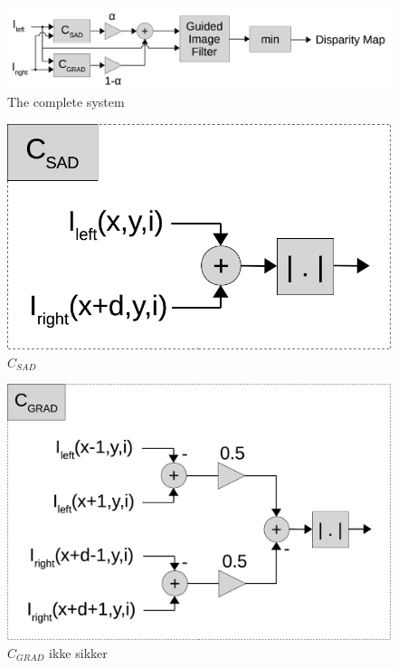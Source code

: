 \begin{figure}[ht!]
  \centering
  \includegraphics[scale=0.3]{figures/whole_system}
  \caption{The complete system}
  \label{fig:whole_system}
\end{figure}

\begin{figure}[ht!]
  \centering
  \includegraphics[scale=0.3]{figures/c_sad}
  \caption{$C_{SAD}$}
  \label{fig:c_sad}
\end{figure}

\begin{figure}[ht!]
  \centering
  \includegraphics[scale=0.3]{figures/c_grad}
  \caption{$C_{GRAD}$ ikke sikker}
  \label{fig:c_grad}
\end{figure}

